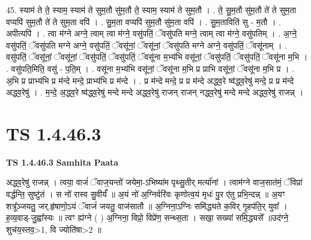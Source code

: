 \documentclass[17pt]{extarticle}
\begin{document}
45. स्याम॑ ते ते॒ स्याम॒ स्याम॑ ते सुम॒तौ सु॑म॒तौ ते॒ स्याम॒ स्याम॑ ते सुम॒तौ । . ते॒ सु॒म॒तौ सु॑म॒तौ ते॑ ते सुम॒ता वप्यपि॑ सुम॒तौ ते॑ ते सुम॒ता वपि॑ । . सु॒म॒ता वप्यपि॑ सुम॒तौ सु॑म॒ता वपि॑ । . सु॒म॒ताविति॑ सु - म॒तौ । . अपीत्यपि॑ । . त्वा म॑ग्ने अग्ने॒ त्वाम् त्वा म॑ग्ने॒ वसु॑पतिं॒ ॅवसु॑पति मग्ने॒ त्वाम् त्वा म॑ग्ने॒ वसु॑पतिम् । . अ॒ग्ने॒ वसु॑पतिं॒ ॅवसु॑पति मग्ने अग्ने॒ वसु॑पतिं॒ ॅवसू॑नां॒ ॅवसू॑नां॒ ॅवसु॑पति मग्ने अग्ने॒ वसु॑पतिं॒ ॅवसू॑नाम् । . वसु॑पतिं॒ ॅवसू॑नां॒ ॅवसू॑नां॒ ॅवसु॑पतिं॒ ॅवसु॑पतिं॒ ॅवसू॑ना म॒भ्य॑भि वसू॑नां॒ ॅवसु॑पतिं॒ ॅवसु॑पतिं॒ ॅवसू॑ना म॒भि । . वसु॑पति॒मिति॒ वसु॑ - प॒ति॒म् । . वसू॑ना म॒भ्य॑भि वसू॑नां॒ ॅवसू॑ना म॒भि प्र प्राभि वसू॑नां॒ ॅवसू॑ना म॒भि प्र । . अ॒भि प्र प्राभ्य॑भि प्र म॑न्दे मन्दे॒ प्राभ्य॑भि प्र म॑न्दे । . प्र म॑न्दे मन्दे॒ प्र प्र म॑न्दे अद्ध्व॒रे ष्व॑द्ध्व॒रेषु॑ मन्दे॒ प्र प्र म॑न्दे अद्ध्व॒रेषु॑ । . म॒न्दे॒ अ॒द्ध्व॒रे ष्व॑द्ध्व॒रेषु॑ मन्दे मन्दे अद्ध्व॒रेषु॑ राजन् राजन् नद्ध्व॒रेषु॑ मन्दे मन्दे अद्ध्व॒रेषु॑ राजन्न् । \newline
\pagebreak
{}

\section{ TS 1.4.46.3 }

\textbf{TS 1.4.46.3 } \newline
\textbf{Samhita Paata} \newline

अद्ध्व॒रेषु॑ राजन्न्  । त्वया॒ वाजं॑ ॅवाज॒यन्तो॑ जयेमा॒-ऽभिष्या॑म पृथ्सु॒तीर् मर्त्या॑नां । त्वाम॑ग्ने वाज॒सात॑मं॒ ॅविप्रा॑ वर्द्धन्ति॒ सुष्टु॑तं । स नो॑ रास्व सु॒वीर्यं᳚ ॥ अ॒यं नो॑ अ॒ग्निर्वरि॑वः कृणोत्व॒यं मृधः॑ पु॒र ए॑तु प्रभि॒न्दन्न्  ॥ अ॒यꣳ शत्रू᳚ञ्जयतु॒ जर्.हृ॑षाणो॒ऽयं ॅवाजं॑ जयतु॒ वाज॑सातौ ॥ अ॒ग्निना॒ऽग्निः समि॑द्ध्यते क॒विर् गृ॒हप॑ति॒र् युवा᳚ । ह॒व्य॒वाड्-जु॒ह्वा᳚स्यः ॥ त्वꣳ ह्य॑ग्ने ( ) अ॒ग्निना॒ विप्रो॒ विप्रे॑ण॒ सन्थ्स॒ता । सखा॒ सख्या॑ समि॒द्ध्यसे᳚ ॥उद॑ग्ने॒ शुच॑य॒स्तव॒>1, वि ज्योति॑षा>2 ॥ \newline
\end{document}
